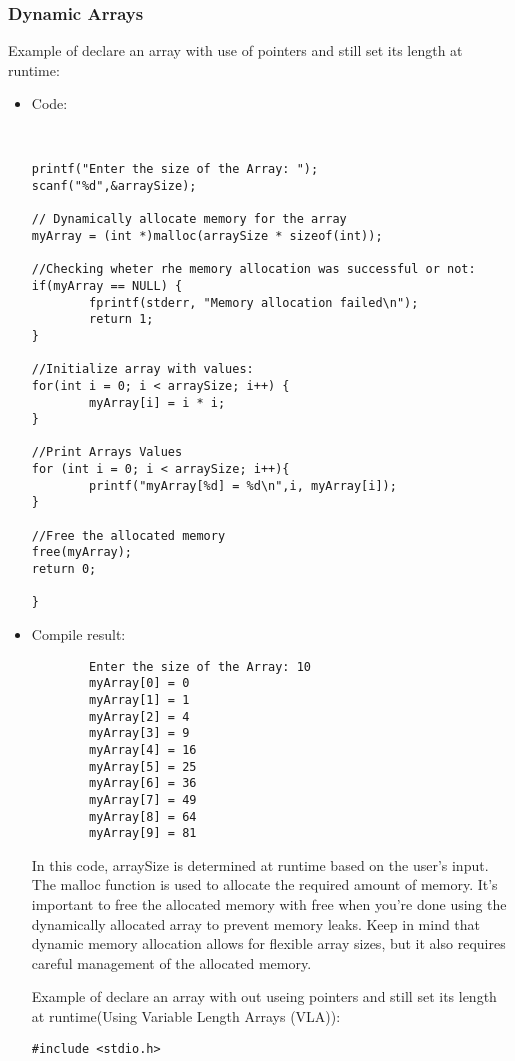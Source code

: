       \subsubsection{Dynamic Arrays}
      Example of declare an array with use of pointers and still set its length at runtime:
      \begin{itemize}
      \item Code:
      \begin{lstlisting}
        
        
printf("Enter the size of the Array: ");
scanf("%d",&arraySize);

// Dynamically allocate memory for the array
myArray = (int *)malloc(arraySize * sizeof(int));

//Checking wheter rhe memory allocation was successful or not:
if(myArray == NULL) {
        fprintf(stderr, "Memory allocation failed\n");
        return 1;
}

//Initialize array with values:
for(int i = 0; i < arraySize; i++) {
        myArray[i] = i * i;
}

//Print Arrays Values
for (int i = 0; i < arraySize; i++){
        printf("myArray[%d] = %d\n",i, myArray[i]);
}

//Free the allocated memory
free(myArray);
return 0;

}

      \end{lstlisting}
      \item Compile result:
      \begin{lstlisting}
        Enter the size of the Array: 10
        myArray[0] = 0
        myArray[1] = 1
        myArray[2] = 4
        myArray[3] = 9
        myArray[4] = 16
        myArray[5] = 25
        myArray[6] = 36
        myArray[7] = 49
        myArray[8] = 64
        myArray[9] = 81
      \end{lstlisting}
      In this code, arraySize is determined at runtime based on the user’s input. The malloc function is used to allocate the required amount of memory. It’s important to free the allocated memory with free when you’re done using the dynamically allocated array to prevent memory leaks.
      Keep in mind that dynamic memory allocation allows for flexible array sizes, but it also requires careful management of the allocated memory.



      Example of declare an array with out useing pointers and still set its length at runtime(Using  Variable Length Arrays (VLA)):
\begin{lstlisting}
#include <stdio.h>


\end{lstlisting}
\end{itemize}
